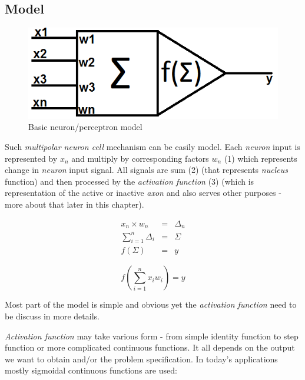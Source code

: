 \newpage
\subsection{Model}

\begin{figure}[!h]
    \centering
    \includegraphics[scale=0.5]{Media/Neuron.png}
    \caption{Basic neuron/perceptron model}
    \label{fig:NeuronModel}
\end{figure}

Such \textit{multipolar neuron cell} mechanism can be easily model. Each \textit{neuron} input is represented by $x_n$ and multiply by corresponding factors $w_n$ (1) which represents change in \textit{neuron} input signal. All signals are sum (2) (that represents \textit{nucleus} function) and then processed by the \textit{activation function} (3) (which is representation of the active or inactive \textit{axon} and also serves other purposes - more about that later in this chapter).

\begin{eqnarray}
x_n \times w_n &=& \Delta_n \\
\sum\limits_{i=1}^n \Delta_i &=& \Sigma \\
f(\Sigma) &=& y
\end{eqnarray}

\begin{mycapequ}[!ht]
    $$f\left(\sum\limits_{i=1}^n x_iw_i\right) = y$$
    \caption{Basic neuron/perceptron model}
    \label{formula:NeuronMathModelEquation}
\end{mycapequ}

Most part of the model is simple and obvious yet the \textit{activation function} need to be discuss in more details.

\textit{Activation function} may take various form - from simple identity function to step function or more complicated continuous functions. It all depends on the output we want to obtain and/or the problem specification. In today's applications mostly sigmoidal continuous functions are used:

